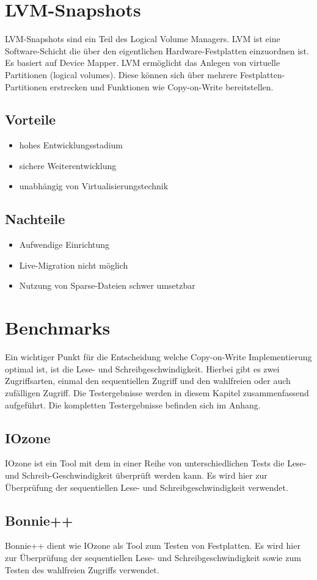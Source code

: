 \section{LVM-Snapshots}
LVM-Snapshots sind ein Teil des Logical Volume Managers. LVM ist eine Software-Schicht die über den eigentlichen Hardware-Festplatten einzuordnen ist. Es basiert auf Device Mapper. LVM ermöglicht das Anlegen von virtuelle Partitionen (logical volumes). Diese können sich über mehrere Festplatten-Partitionen erstrecken und Funktionen wie Copy-on-Write bereitstellen. \cite{lvmhowto} \cite{lvmselflinux} \cite{lvmsource}

\subsection{Vorteile}
\begin{itemize}
 \item hohes Entwicklungsstadium
 \item sichere Weiterentwicklung
 \item unabhängig von Virtualisierungstechnik
\end{itemize}

\subsection{Nachteile}
\begin{itemize}
 \item Aufwendige Einrichtung
 \item Live-Migration nicht möglich
 \item Nutzung von Sparse-Dateien schwer umsetzbar
\end{itemize}

\section{Benchmarks}
Ein wichtiger Punkt für die Entscheidung welche Copy-on-Write Implementierung optimal ist, ist die Lese- und Schreibgeschwindigkeit. Hierbei gibt es zwei Zugriffsarten, einmal den sequentiellen Zugriff und den wahlfreien oder auch zufälligen Zugriff. Die Testergebnisse werden in diesem Kapitel zusammenfassend aufgeführt. Die kompletten Testergebnisse befinden sich im Anhang.

\subsection{IOzone}
IOzone ist ein Tool mit dem in einer Reihe von unterschiedlichen Tests die Lese- und Schreib-Geschwindigkeit überprüft werden kann. Es wird hier zur Überprüfung der sequentiellen Lese- und Schreibgeschwindigkeit verwendet.
\subsection{Bonnie++}
Bonnie++ dient wie IOzone als Tool zum Testen von Festplatten. Es wird hier zur Überprüfung der sequentiellen Lese- und Schreibgeschwindigkeit sowie zum Testen des wahlfreien Zugriffs verwendet.